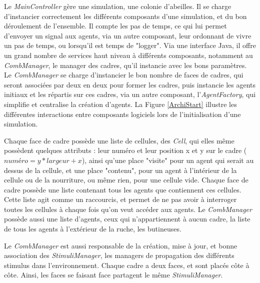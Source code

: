 			Le \textit{MainController} gère une simulation, une colonie d'abeilles. Il se charge d'instancier correctement les différents composants d'une simulation, et du bon déroulement de l'ensemble. Il compte les pas de temps, ce qui lui permet d'envoyer un signal aux agents, via un autre composant, leur ordonnant de vivre un pas de temps, ou lorsqu'il est temps de "logger". Via une interface Java, il offre un grand nombre de services haut niveau à différents composants, notamment au \textit{CombManager}, le manager des cadres, qu'il instancie avec les bons paramètres. Le \textit{CombManager} se charge d'instancier le bon nombre de faces de cadres, qui seront associées par deux en deux pour former les cadres, puis instancie les agents initiaux et les répartis sur ces cadres, via un autre composant, l'\textit{AgentFactory}, qui simplifie et centralise la création d'agents. La Figure \ref{ArchiStart} illustre les différentes interactions entre composants logiciels lors de l'initialisation d'une simulation.
			
			Chaque face de cadre possède une liste de cellules, des \textit{Cell}, qui elles même possèdent quelques attributs : leur numéro et leur position x et y sur le cadre ($numéro = y * largeur + x$), ainsi qu'une place "visite" pour un agent qui serait au dessus de la cellule, et une place "contenu", pour un agent à l'intérieur de la cellule ou de la nourriture, ou même rien, pour une cellule vide. Chaque face de cadre possède une liste contenant tous les agents que contiennent ces cellules. Cette liste agit comme un raccourcis, et permet de ne pas avoir à interroger toutes les cellules à chaque fois qu'on veut accéder aux agents. Le \textit{CombManager} possède aussi une liste d'agents, ceux qui n'appartiennent à aucun cadre, la liste de tous les agents à l'extérieur de la ruche, les butineuses.
			
			Le \textit{CombManager} est aussi responsable de la création, mise à jour, et bonne association des \textit{StimuliManager}, les managers de propagation des différents stimulus dans l'environnement. Chaque cadre a deux faces, et sont placés côte à côte. Ainsi, les faces se faisant face partagent le même \textit{StimuliManager}. 
			
			
